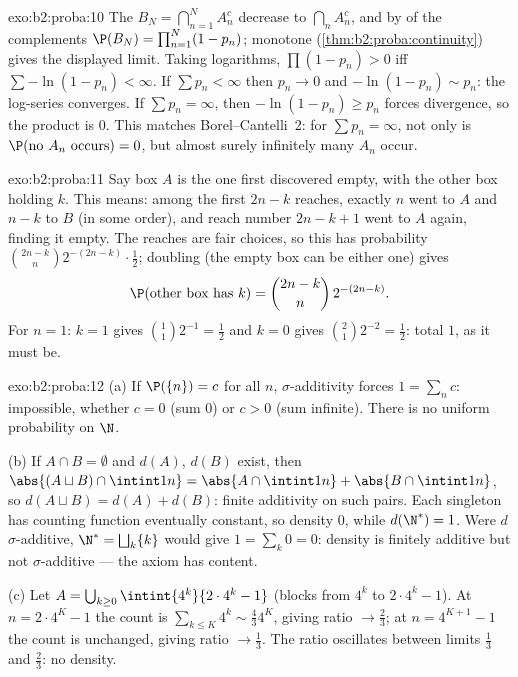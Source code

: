 \begin{solution}{exo:b2:proba:10}
The  $B_N = \bigcap_{n=1}^N A_n^c$ decrease to
$\bigcap_nA_n^c$, and by  of the complements
$\P(B_N) = \prod_{n=1}^N(1 - p_n)$; monotone 
(\cref{thm:b2:proba:continuity}) gives the displayed limit.
Taking logarithms, $\prod(1 - p_n) > 0$ iff $\sum-\ln(1 -
p_n) < \infty$. If $\sum p_n < \infty$ then $p_n \to 0$ and
$-\ln(1 - p_n) \sim p_n$: the log-series converges. If
$\sum p_n = \infty$, then $-\ln(1 - p_n) \geq p_n$ forces
divergence, so the product is $0$. This matches
Borel--Cantelli~2: for $\sum p_n = \infty$, not only is
$\P(\text{no }A_n\text{ occurs}) = 0$, but almost surely
infinitely many $A_n$ occur.
\end{solution}

\begin{solution}{exo:b2:proba:11}
Say box $A$ is the one first discovered empty, with the other
box holding $k$. This means: among the first $2n - k$
reaches, exactly $n$ went to $A$ and $n - k$ to $B$ (in some
order), and reach number $2n - k + 1$ went to $A$ again,
finding it empty. The reaches are  fair choices,
so this  has probability
$\binom{2n-k}{n}2^{-(2n-k)}\cdot\frac12$; doubling (the empty
box can be either one) gives
\[
\P(\text{other box has }k) = \binom{2n-k}{n}\,2^{-(2n-k)} .
\]
For $n = 1$: $k = 1$ gives $\binom11 2^{-1} = \frac12$ and $k
= 0$ gives $\binom21 2^{-2} = \frac12$: total $1$, as it must
be.
\end{solution}

\begin{solution}{exo:b2:proba:12}
(a) If $\P(\{n\}) = c$ for all $n$, $\sigma$-additivity
forces $1 = \sum_nc$: impossible, whether $c = 0$ (sum $0$)
or $c > 0$ (sum infinite). There is no uniform probability on
$\N$.

(b) If $A \cap B = \emptyset$ and $d(A)$, $d(B)$ exist, then
$\abs{(A \sqcup B)\cap\intint1n} = \abs{A\cap\intint1n} +
\abs{B\cap\intint1n}$, so $d(A \sqcup B) = d(A) + d(B)$:
finite additivity on such pairs. Each singleton has counting
function eventually constant, so density $0$, while
$d(\N^*) = 1$. Were $d$ $\sigma$-additive, $\N^* =
\bigsqcup_k\{k\}$ would give $1 = \sum_k 0 = 0$: density is
finitely additive but not $\sigma$-additive --- the axiom has
content.

(c) Let $A = \bigcup_{k\geq0}\intint{4^k}{2\cdot4^k - 1}$
(blocks from $4^k$ to $2\cdot4^k - 1$). At $n = 2\cdot4^K -
1$ the count is $\sum_{k\leq K}4^k \sim \frac43 4^K$, giving
ratio $\to \frac23$; at $n = 4^{K+1} - 1$ the count is
unchanged, giving ratio $\to \frac13$. The ratio oscillates
between limits $\frac13$ and $\frac23$: no density.
\end{solution}

